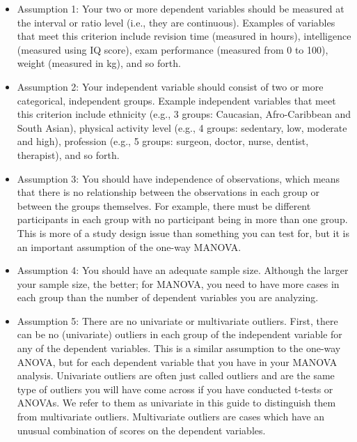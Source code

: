 \documentclass[12pt]{article} %
\begin{document}
\begin{itemize}
\item Assumption 1: Your two or more dependent variables should be measured at the interval or ratio level (i.e., they are continuous). Examples of variables that meet this criterion include revision time (measured in hours), intelligence (measured using IQ score), exam performance (measured from 0 to 100), weight (measured in kg), and so forth.\\

\item Assumption 2: Your independent variable should consist of two or more categorical, independent groups. Example independent variables that meet this criterion include ethnicity (e.g., 3 groups: Caucasian, Afro-Caribbean and South Asian), physical activity level (e.g., 4 groups: sedentary, low, moderate and high), profession (e.g., 5 groups: surgeon, doctor, nurse, dentist, therapist), and so forth.\\

\item Assumption 3: You should have independence of observations, which means that there is no relationship between the observations in each group or between the groups themselves. For example, there must be different participants in each group with no participant being in more than one group. This is more of a study design issue than something you can test for, but it is an important assumption of the one-way MANOVA.\\

\item Assumption 4: You should have an adequate sample size. Although the larger your sample size, the better; for MANOVA, you need to have more cases in each group than the number of dependent variables you are analyzing.\\

\item Assumption 5: There are no univariate or multivariate outliers. First, there can be no (univariate) outliers in each group of the independent variable for any of the dependent variables. This is a similar assumption to the one-way ANOVA, but for each dependent variable that you have in your MANOVA analysis. Univariate outliers are often just called outliers and are the same type of outliers you will have come across if you have conducted t-tests or ANOVAs. We refer to them as univariate in this guide to distinguish them from multivariate outliers. Multivariate outliers are cases which have an unusual combination of scores on the dependent variables. \\ \bigskip


\end{itemize}
\end{document}
